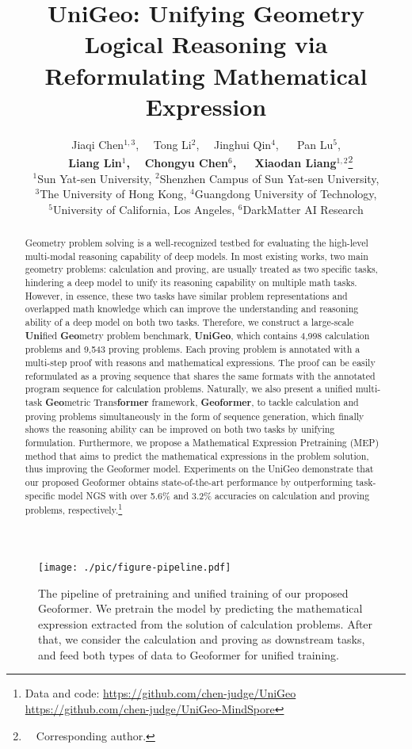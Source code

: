 \documentclass[11pt]{article}
\title{UniGeo: Unifying Geometry Logical Reasoning via  Reformulating Mathematical Expression}
\author{Jiaqi Chen$^{1,3}$,~~ Tong Li$^{2}$,~~ Jinghui Qin$^{4}$, ~~ Pan Lu$^{5}$, \\ 
~~ {\bf Liang Lin}$^{1}${\bf ,} ~~{\bf Chongyu Chen}$^{6}${\bf ,} ~~ {\bf Xiaodan Liang}$^{1,2}$\thanks{~~Corresponding author.}~\\
{$^1$Sun Yat-sen University, $^2$Shenzhen Campus of Sun Yat-sen University, } \\
{ $^3$The University of Hong Kong, $^4$Guangdong University of Technology, }\\ {$^5$University of California, Los Angeles, $^6$DarkMatter AI Research}\\
}
\begin{document}
\maketitle


\begin{abstract}
Geometry problem solving is a well-recognized testbed for evaluating the high-level multi-modal reasoning capability of deep models. In most existing works, two main geometry problems: calculation and proving, are usually treated as two specific tasks, hindering a deep model to unify its reasoning capability on multiple math tasks. However, in essence, these two tasks have similar problem representations and overlapped math knowledge which can improve the understanding and reasoning ability of a deep model on both two tasks.
Therefore, we construct a large-scale \textbf{Uni}fied \textbf{Geo}metry problem benchmark, \textbf{UniGeo}, which contains 4,998 calculation problems and 9,543 proving problems.
Each proving problem is annotated with a multi-step proof with reasons and mathematical expressions. The proof can be easily reformulated as a proving sequence that shares the same formats with the annotated program sequence for calculation problems.
Naturally, we also present a unified multi-task \textbf{Geo}metric Trans\textbf{former} framework, \textbf{Geoformer}, to tackle calculation and proving problems simultaneously in the form of sequence generation, which finally shows the reasoning ability can be improved on both two tasks by unifying formulation. Furthermore, we propose a Mathematical Expression Pretraining (MEP) method that aims to predict the mathematical expressions in the problem solution, thus improving the Geoformer model.
Experiments on the UniGeo demonstrate that our proposed Geoformer obtains state-of-the-art performance by outperforming task-specific model NGS with over 5.6\% and 3.2\% accuracies on calculation and proving problems, respectively.\footnote{Data and code: \href{https://github.com/chen-judge/UniGeo}{https://github.com/chen-judge/UniGeo} \href{https://github.com/chen-judge/UniGeo-MindSpore}{https://github.com/chen-judge/UniGeo-MindSpore}}


\end{abstract}

\begin{figure}[t]
\begin{center}
 \texttt{[image: ./pic/figure-pipeline.pdf]}
 \vspace{-8mm}
\end{center}
  \caption{
  The pipeline of pretraining and unified training of our proposed Geoformer. We pretrain the model by predicting the mathematical expression extracted from the solution of calculation problems. After that, we consider the calculation and proving as downstream tasks, and feed both types of data to Geoformer for unified training. 
  }
\vspace{-2mm}
\label{fig:pipeline}
\end{figure}
\end{document}
